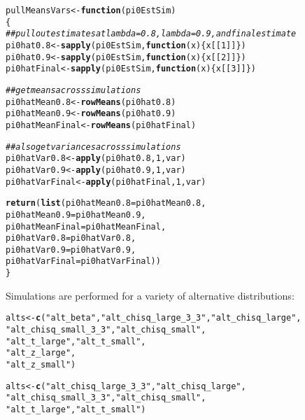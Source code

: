 \documentclass{article}\usepackage[]{graphicx}\usepackage[]{color}
\makeatletter
\newcommand{\hlnum}[1]{\textcolor[rgb]{0.686,0.059,0.569}{#1}}%
\newcommand{\hlstr}[1]{\textcolor[rgb]{0.192,0.494,0.8}{#1}}%
\newcommand{\hlcom}[1]{\textcolor[rgb]{0.678,0.584,0.686}{\textit{#1}}}%
\newcommand{\hlstd}[1]{\textcolor[rgb]{0.345,0.345,0.345}{#1}}%
\newcommand{\hlkwa}[1]{\textcolor[rgb]{0.161,0.373,0.58}{\textbf{#1}}}%
\newcommand{\hlkwb}[1]{\textcolor[rgb]{0.69,0.353,0.396}{#1}}%
\newcommand{\hlkwc}[1]{\textcolor[rgb]{0.333,0.667,0.333}{#1}}%
\newcommand{\hlkwd}[1]{\textcolor[rgb]{0.737,0.353,0.396}{\textbf{#1}}}%
\newenvironment{kframe}{%
 \def\at@end@of@kframe{}%
 \ifinner\ifhmode%
  \def\at@end@of@kframe{\end{minipage}}%
  \begin{minipage}{\columnwidth}%
 \fi\fi%
 \def\FrameCommand##1{\hskip\@totalleftmargin \hskip-\fboxsep
 \colorbox{shadecolor}{##1}\hskip-\fboxsep
     \hskip-\linewidth \hskip-\@totalleftmargin \hskip\columnwidth}%
 \MakeFramed {\advance\hsize-\width
   \@totalleftmargin\z@ \linewidth\hsize
   \@setminipage}}%
 {\par\unskip\endMakeFramed%
 \at@end@of@kframe}
\newenvironment{knitrout}{}{} %
\makeatother
\begin{document}
\begin{knitrout}
\color{fgcolor}\begin{kframe}
\begin{alltt}
\hlstd{pullMeansVars} \hlkwb{<-} \hlkwa{function}\hlstd{(}\hlkwc{pi0EstSim}\hlstd{)}
\hlstd{\{}
  \hlcom{##pull out estimates at lambda=0.8, lambda=0.9, and final estimate}
  \hlstd{pi0hat0.8} \hlkwb{<-} \hlkwd{sapply}\hlstd{(pi0EstSim,} \hlkwa{function}\hlstd{(}\hlkwc{x}\hlstd{)\{x[[}\hlnum{1}\hlstd{]]\})}
  \hlstd{pi0hat0.9} \hlkwb{<-} \hlkwd{sapply}\hlstd{(pi0EstSim,} \hlkwa{function}\hlstd{(}\hlkwc{x}\hlstd{)\{x[[}\hlnum{2}\hlstd{]]\})}
  \hlstd{pi0hatFinal} \hlkwb{<-} \hlkwd{sapply}\hlstd{(pi0EstSim,} \hlkwa{function}\hlstd{(}\hlkwc{x}\hlstd{)\{x[[}\hlnum{3}\hlstd{]]\})}

  \hlcom{##get means across simulations}
  \hlstd{pi0hatMean0.8} \hlkwb{<-} \hlkwd{rowMeans}\hlstd{(pi0hat0.8)}
  \hlstd{pi0hatMean0.9} \hlkwb{<-} \hlkwd{rowMeans}\hlstd{(pi0hat0.9)}
  \hlstd{pi0hatMeanFinal} \hlkwb{<-} \hlkwd{rowMeans}\hlstd{(pi0hatFinal)}

  \hlcom{##also get variances across simulations}
  \hlstd{pi0hatVar0.8} \hlkwb{<-} \hlkwd{apply}\hlstd{(pi0hat0.8,}\hlnum{1}\hlstd{,var)}
  \hlstd{pi0hatVar0.9} \hlkwb{<-} \hlkwd{apply}\hlstd{(pi0hat0.9,}\hlnum{1}\hlstd{,var)}
  \hlstd{pi0hatVarFinal} \hlkwb{<-} \hlkwd{apply}\hlstd{(pi0hatFinal,}\hlnum{1}\hlstd{,var)}

  \hlkwd{return}\hlstd{(}\hlkwd{list}\hlstd{(}\hlkwc{pi0hatMean0.8}\hlstd{=pi0hatMean0.8,}
              \hlkwc{pi0hatMean0.9}\hlstd{=pi0hatMean0.9,}
              \hlkwc{pi0hatMeanFinal}\hlstd{=pi0hatMeanFinal,}
              \hlkwc{pi0hatVar0.8}\hlstd{=pi0hatVar0.8,}
              \hlkwc{pi0hatVar0.9}\hlstd{=pi0hatVar0.9,}
              \hlkwc{pi0hatVarFinal}\hlstd{=pi0hatVarFinal))}
\hlstd{\}}
\end{alltt}
\end{kframe}
\end{knitrout}

Simulations are performed for a variety of alternative distributions:
\begin{knitrout}
\color{fgcolor}\begin{kframe}
\begin{alltt}
\hlstd{alts} \hlkwb{<-} \hlkwd{c}\hlstd{(}\hlstr{"alt_beta"}\hlstd{,}\hlstr{"alt_chisq_large_3_3"}\hlstd{,}\hlstr{"alt_chisq_large"}\hlstd{,}
          \hlstr{"alt_chisq_small_3_3"}\hlstd{,}\hlstr{"alt_chisq_small"}\hlstd{,}
          \hlstr{"alt_t_large"}\hlstd{,}\hlstr{"alt_t_small"}\hlstd{,}
          \hlstr{"alt_z_large"}\hlstd{,}
          \hlstr{"alt_z_small"}\hlstd{)}

\hlstd{alts} \hlkwb{<-} \hlkwd{c}\hlstd{(}\hlstr{"alt_chisq_large_3_3"}\hlstd{,}\hlstr{"alt_chisq_large"}\hlstd{,}
          \hlstr{"alt_chisq_small_3_3"}\hlstd{,}\hlstr{"alt_chisq_small"}\hlstd{,}
          \hlstr{"alt_t_large"}\hlstd{,}\hlstr{"alt_t_small"}\hlstd{)}
\end{alltt}
\end{kframe}
\end{knitrout}
\end{document}
